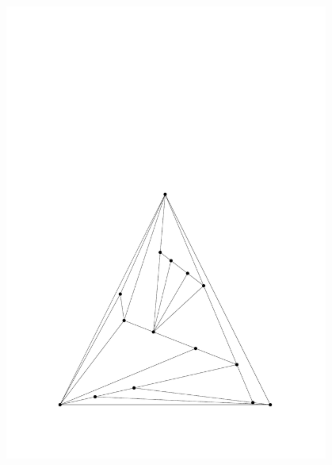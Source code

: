 \begin{figure}
\begin{minipage}{0.48\textwidth}
    \includegraphics[width=0.95\textwidth]{vis_15_1.pdf}
  \end{minipage}
    \hfill
  \begin{minipage}{0.48\textwidth}
  \centering

\end{minipage}
\end{figure}
